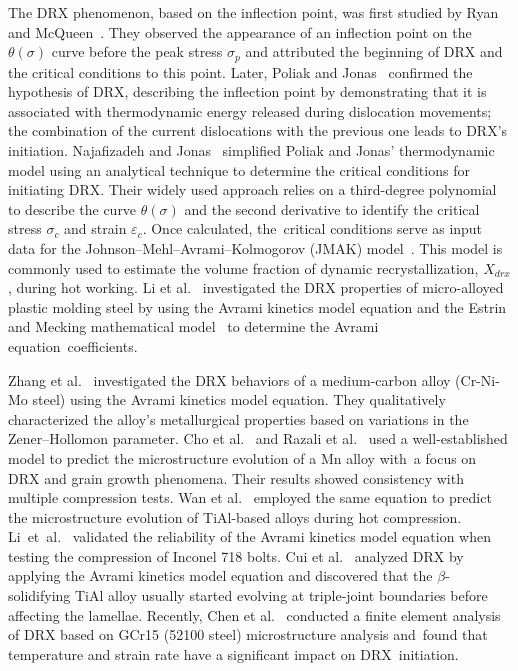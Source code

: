 \documentclass[metals,article,accept,pdftex,moreauthors]{Definitions/mdpi}
\makeatletter
\DeclareRobustCommand{\eal}{et al.\@\xspace}
\makeatother
\begin{document}
The DRX phenomenon, based on the inflection point, was first studied by Ryan and McQueen~\cite{Ryan-1989, Ryan-1990, Ryan-1990-2}.
They observed the appearance of an inflection point on the $\theta(\sigma)$ curve before the peak stress $\sigma_p$ and attributed the beginning of DRX and the critical conditions to this point.
Later, Poliak and Jonas~\cite{Poliak-1996,Poliak-2003,Poliak-2003-2,Jonas-2003} confirmed the hypothesis of DRX, describing the inflection point by demonstrating that it is associated with thermodynamic energy released during dislocation movements; the combination of the current dislocations with the previous one leads to DRX's initiation.
Najafizadeh and Jonas~\cite{Najafizadeh-2006} simplified Poliak and Jonas' thermodynamic model using an analytical technique to determine the critical conditions for initiating DRX.
Their widely used approach relies on a third-degree polynomial to describe the curve $\theta(\sigma)$ and the second derivative to identify the critical stress $\sigma_c$ and strain $\varepsilon_c$.
Once calculated, the~critical conditions serve as input data for the Johnson--Mehl--Avrami--Kolmogorov (JMAK) model~\cite{Avrami-1939}.
This model is commonly used to estimate the volume fraction of dynamic recrystallization, $X_{drx}$, during hot working.
\linebreak Li \eal~\cite{Li-2015} investigated the DRX properties of micro-alloyed plastic molding steel by using the Avrami kinetics model equation and the Estrin and Mecking mathematical model~\cite{Estrin-1984,Mecking-1981} to determine the Avrami equation~coefficients.

Zhang \eal~\cite{Zhang-2016} investigated the DRX behaviors of a medium-carbon alloy (Cr-Ni-Mo steel) using the Avrami kinetics model equation.
They qualitatively characterized the alloy's metallurgical properties based on variations in the Zener--Hollomon parameter.
\linebreak Cho \eal~\cite{Cho-2005} and Razali \eal~\cite{Razali-2021} used a well-established model to predict the microstructure evolution of a Mn alloy with~a focus on DRX and grain growth phenomena.
\linebreak Their results showed consistency with multiple compression tests.
Wan \eal~\cite{Wan-2017} employed the same equation to predict the microstructure evolution of TiAl-based alloys during hot compression.
\mbox{Li \eal~\cite{Li-2018}} validated the reliability of the Avrami kinetics model equation when testing the compression of Inconel 718 bolts.
Cui \eal~\cite{Cui-2016} analyzed DRX by applying the Avrami kinetics model equation and discovered that the $\beta$-solidifying TiAl alloy usually started evolving at triple-joint boundaries before affecting the lamellae.
\linebreak Recently, Chen \eal~\cite{Chen-2023} conducted a finite element analysis of DRX based on GCr15 (52100 steel) microstructure analysis and~found that temperature and strain rate have a significant impact on DRX~initiation.
\end{document}
